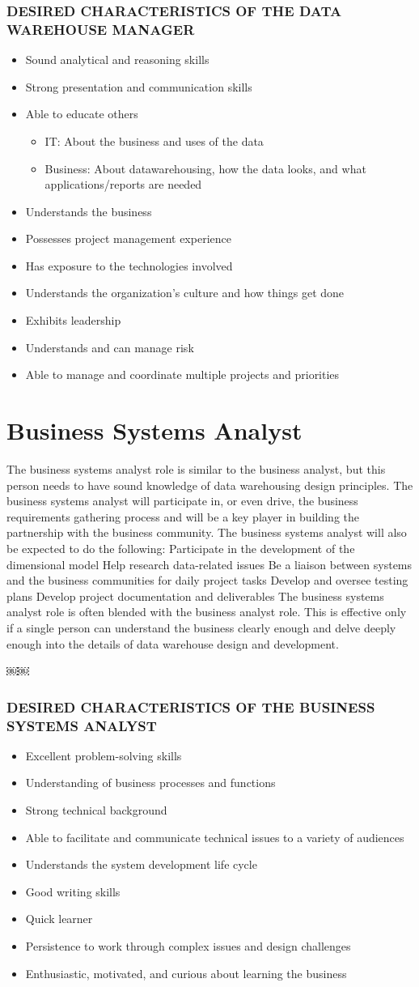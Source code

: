 \documentclass{vldb}
\newcommand{\bi}{\begin{itemize}}
\newcommand{\ei}{\end{itemize}}
\newcommand{\ii}{\item}
\begin{document}
\subsubsection*{DESIRED CHARACTERISTICS OF THE DATA WAREHOUSE MANAGER}

\bi
\ii Sound analytical and reasoning skills
\ii Strong presentation and communication skills 
\ii Able to educate others
\bi
\ii IT: About the business and uses of the data
\ii Business: About datawarehousing, how the data looks, and what applications/reports are needed
\ei
\ii Understands the business
\ii Possesses project management experience
\ii Has exposure to the technologies involved
\ii Understands the organization’s culture and how things get done
\ii Exhibits leadership
\ii Understands and can manage risk
\ii Able to manage and coordinate multiple projects and priorities
\ei

\section{Business Systems Analyst}
The business systems analyst role is similar to the business analyst, but this person needs to have sound knowledge of data warehousing design principles. The business systems analyst will participate in, or even drive, the business requirements gathering process and will be a key player in building the partnership with the business community. The business systems analyst will also be expected to do the following:
Participate in the development of the dimensional model Help research data-related issues
Be a liaison between systems and the business communities for daily project tasks
Develop and oversee testing plans
Develop project documentation and deliverables
The business systems analyst role is often blended with the business analyst role. This is effective only if a single person can understand the business clearly enough and delve deeply enough into the details of data warehouse design and development.

￼￼\subsubsection*{DESIRED CHARACTERISTICS OF THE BUSINESS SYSTEMS ANALYST}
\bi
\ii Excellent problem-solving skills
\ii Understanding of business processes and functions
\ii Strong technical background
\ii Able to facilitate and communicate technical issues to a variety of audiences
\ii Understands the system development life cycle
\ii Good writing skills
\ii Quick learner
\ii Persistence to work through complex issues and design challenges
\ii Enthusiastic, motivated, and curious about learning the business
\ei
\end{document}
